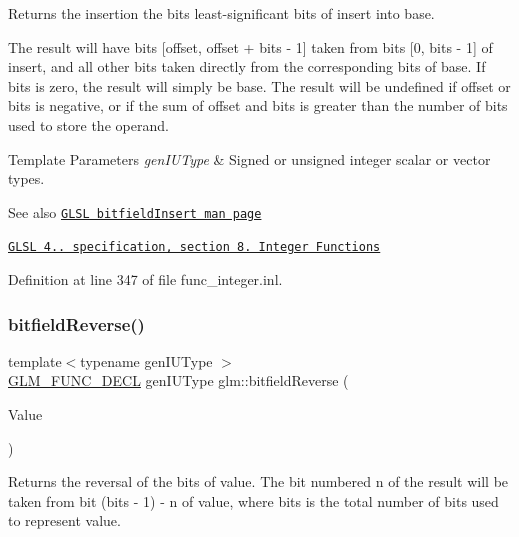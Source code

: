 Returns the insertion the bits least-\/significant bits of insert into base.

The result will have bits \mbox{[}offset, offset + bits -\/ 1\mbox{]} taken from bits \mbox{[}0, bits -\/ 1\mbox{]} of insert, and all other bits taken directly from the corresponding bits of base. If bits is zero, the result will simply be base. The result will be undefined if offset or bits is negative, or if the sum of offset and bits is greater than the number of bits used to store the operand.


\begin{DoxyTemplParams}{Template Parameters}
{\em gen\+I\+U\+Type} & Signed or unsigned integer scalar or vector types.\\
\hline
\end{DoxyTemplParams}
\begin{DoxySeeAlso}{See also}
\href{http://www.opengl.org/sdk/docs/manglsl/xhtml/bitfieldInsert.xml}{\tt G\+L\+SL bitfield\+Insert man page} 

\href{http://www.opengl.org/registry/doc/GLSLangSpec.4.20.8.pdf}{\tt G\+L\+SL 4.. specification, section 8. Integer Functions} 
\end{DoxySeeAlso}


Definition at line 347 of file func\+\_\+integer.\+inl.

\mbox{\label{group__core__func__integer_gac28880e609c6eeb0a28f1a54b1edc715}} 
\subsubsection{\texorpdfstring{bitfield\+Reverse()}{bitfieldReverse()}}
{\footnotesize\ttfamily template$<$typename gen\+I\+U\+Type $>$ \\
\hyperlink{setup_8hpp_ab2d052de21a70539923e9bcbf6e83a51}{G\+L\+M\+\_\+\+F\+U\+N\+C\+\_\+\+D\+E\+CL} gen\+I\+U\+Type glm\+::bitfield\+Reverse (\begin{DoxyParamCaption}\item[{gen\+I\+U\+Type const \&}]{Value }\end{DoxyParamCaption})}

Returns the reversal of the bits of value. The bit numbered n of the result will be taken from bit (bits -\/ 1) -\/ n of value, where bits is the total number of bits used to represent value.


